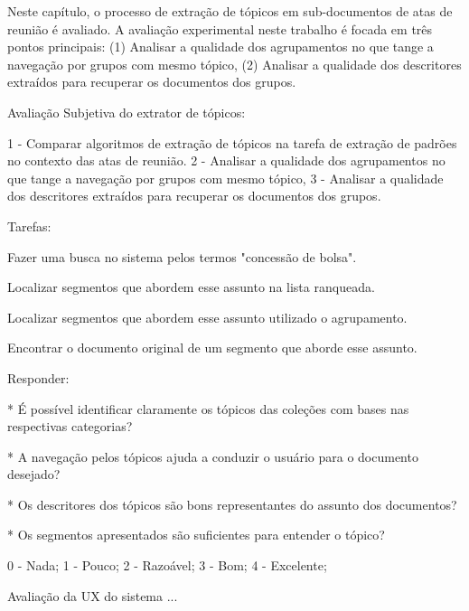 Neste capítulo, o processo de extração de tópicos em sub-documentos de atas de reunião é avaliado. A avaliação experimental neste trabalho é focada em três pontos principais: 
(1) Analisar a qualidade dos agrupamentos no que tange a navegação por grupos com mesmo tópico, 
(2) Analisar a qualidade dos descritores extraídos para recuperar os documentos dos grupos.























Avaliação Subjetiva do extrator de tópicos:

1 - Comparar algoritmos de extração de tópicos na tarefa de extração de padrões no contexto
das atas de reunião. 
2 - Analisar a qualidade dos agrupamentos no que tange a navegação por grupos com mesmo tópico, 
3 - Analisar a qualidade dos descritores extraídos para recuperar os documentos dos grupos.


Tarefas:

Fazer uma busca no sistema pelos termos "concessão de bolsa".

Localizar segmentos que abordem esse assunto na lista ranqueada.

Localizar segmentos que abordem esse assunto utilizado o agrupamento.

Encontrar o documento original de um segmento que aborde esse assunto.

Responder:


* É possível identificar claramente os tópicos das coleções com bases nas respectivas categorias?


* A navegação pelos tópicos ajuda a conduzir o usuário para o documento desejado?


* Os descritores dos tópicos são bons representantes do assunto dos documentos?


* Os segmentos apresentados são suficientes para entender o tópico?





0 - Nada;
1 - Pouco;
2 - Razoável;
3 - Bom;
4 - Excelente;



Avaliação da UX do sistema ...























